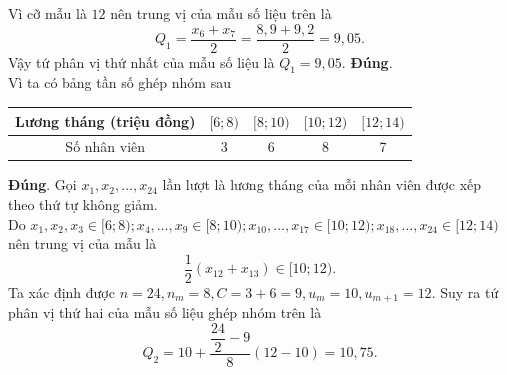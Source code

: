 \begin{ex}
{\begin{itemchoice}
\begin{center}
\begin{tabular}{llllllllllll}
    \end{tabular}
   \end{center}
   Vì cỡ mẫu là $12$  nên trung vị của mẫu số liệu trên là $$Q_1= \dfrac{x_6+x_7}{2}= \dfrac{8{,}9+9{,}2}{2}= 9{,}05.$$
   Vậy tứ phân  vị thứ nhất của mẫu số liệu là $Q_1= 9{,}05$.
   \itemch \textbf{Đúng}.  \\
   Vì  ta có bảng tần số ghép nhóm sau
   \begin{center}
    \begin{tabular}{|c|c|c|c|c|}
     \hline 
     Lương tháng (triệu đồng) & $[6; 8)$ & $[8;10)$ & $[10; 12)$ &  $[12;14)$\\
      \hline
     Số nhân viên & 3 & 6  & 8 & 7 \\
     \hline 
    \end{tabular}
   \end{center}
   \itemch \textbf{Đúng}.  Gọi $x_1, x_2, \ldots , x_{24}$ lần lượt là lương tháng của mỗi nhân viên được xếp theo thứ tự không giảm.\\
   Do $x_1, x_2, x_3 \in [6;8); x_4, \ldots , x_9 \in [8;10); x_{10}, \ldots ,x_{17} \in [10;12); x_{18}, \ldots , x_{24} \in [12;14)$ nên trung vị của mẫu là $$\dfrac{1}{2}(x_{12}+x_{13}) \in  [10;12).$$
   Ta xác định được $n=24, n_m =8 , C=3+6=9, u_m=  10, u_{m+1}=12$. Suy ra tứ phân vị thứ hai của mẫu số liệu ghép nhóm trên là
   $$Q_2= 10 + \dfrac{\dfrac{24}{2}-9}{8}(12-10)=10{,}75.$$ 
  \end{itemchoice}
 } 
\end{ex}

